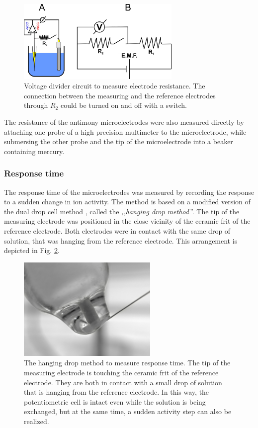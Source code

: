 \begin{figure}
\centering
\includegraphics[width=0.7\textwidth]{img/divider_switch.jpg}
\caption[Voltage divider circuit to measure electrode resistance]{Voltage divider circuit to measure electrode resistance.
The connection between the measuring and the reference electrodes through $R_2$ could be turned on and off with a switch.} 
\label{fig:divider}
\end{figure}

The resistance of the antimony microelectrodes were also measured directly by attaching one probe of a high precision multimeter to the microelectrode, while submersing the other probe and the tip of the microelectrode into a beaker containing mercury.

			\subsubsection{Response time}
The response time of the microelectrodes was measured by recording the response to a sudden change in ion activity. The method is based on a modified version of the dual drop cell method \cite{lamaka2009novel}, called the \emph{,,hanging drop method''}.
The tip of the measuring electrode was positioned in the close vicinity of the ceramic frit of the reference electrode. Both electrodes were in contact with the same drop of solution, that was hanging from the reference electrode. This arrangement is depicted in Fig. \ref{fig:hanging}.

\begin{figure}
\centering
\includegraphics[width=0.6\textwidth]{img/hanging.jpg}
\caption[The hanging drop method]{The hanging drop method to measure response time.
The tip of the measuring electrode is touching the ceramic frit of the reference electrode. They are both in contact with a small drop of solution that is hanging from the reference electrode. In this way, the potentiometric cell is intact even while the solution is being exchanged, but at the same time, a sudden activity step can also be realized.} 
\label{fig:hanging}
\end{figure}


